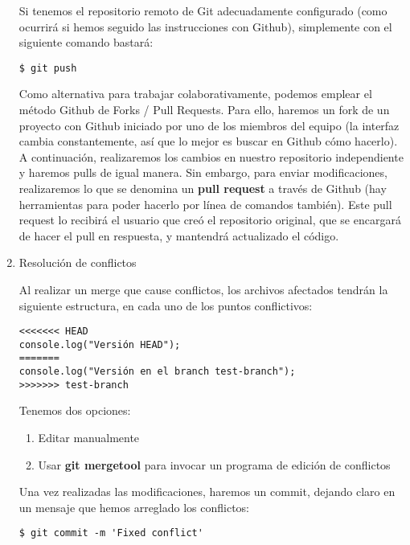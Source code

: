 \documentclass[a4paper,oneside]{article}
\begin{document}
\begin{enumerate}
Si tenemos el repositorio remoto de Git adecuadamente configurado (como ocurrirá si hemos seguido las instrucciones con Github), simplemente con el siguiente comando bastará:

    \begin{verbatim}
$ git push
    \end{verbatim}

Como alternativa para trabajar colaborativamente, podemos emplear el método Github de Forks / Pull Requests. Para ello, haremos un fork de un proyecto con Github iniciado por uno de los miembros del equipo (la interfaz cambia constantemente, así que lo mejor es buscar en Github cómo hacerlo). A continuación, realizaremos los cambios en nuestro repositorio independiente y haremos pulls de igual manera. Sin embargo, para enviar modificaciones, realizaremos lo que se denomina un \textbf{pull request} a través de Github (hay herramientas para poder hacerlo por línea de comandos también). Este pull request lo recibirá el usuario que creó el repositorio original, que se encargará de hacer el pull en respuesta, y mantendrá actualizado el código.

  \item Resolución de conflictos

Al realizar un merge que cause conflictos, los archivos afectados tendrán la siguiente estructura, en cada uno de los puntos conflictivos:

    \begin{verbatim}
<<<<<<< HEAD
console.log("Versión HEAD");
=======
console.log("Versión en el branch test-branch");
>>>>>>> test-branch
    \end{verbatim}

Tenemos dos opciones:
    \begin{enumerate}
      \item Editar manualmente
      \item Usar \textbf{git mergetool} para invocar un programa de edición de conflictos
    \end{enumerate}

Una vez realizadas las modificaciones, haremos un commit, dejando claro en un mensaje que hemos arreglado los conflictos:

    \begin{verbatim}
$ git commit -m 'Fixed conflict'
    \end{verbatim}


\end{enumerate}
\end{document}

